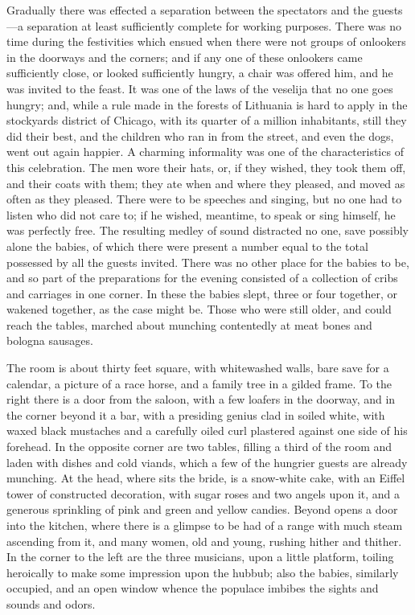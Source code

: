 \documentclass[
]{book}
\theoremstyle{definition}
\theoremstyle{definition}
\theoremstyle{definition}
\theoremstyle{definition}
\theoremstyle{remark}
\begin{document}
Gradually there was effected a separation between the spectators and the guests---a separation at least sufficiently complete for working purposes. There was no time during the festivities which ensued when there were not groups of onlookers in the doorways and the corners; and if any one of these onlookers came sufficiently close, or looked sufficiently hungry, a chair was offered him, and he was invited to the feast. It was one of the laws of the veselija that no one goes hungry; and, while a rule made in the forests of Lithuania is hard to apply in the stockyards district of Chicago, with its quarter of a million inhabitants, still they did their best, and the children who ran in from the street, and even the dogs, went out again happier. A charming informality was one of the characteristics of this celebration. The men wore their hats, or, if they wished, they took them off, and their coats with them; they ate when and where they pleased, and moved as often as they pleased. There were to be speeches and singing, but no one had to listen who did not care to; if he wished, meantime, to speak or sing himself, he was perfectly free. The resulting medley of sound distracted no one, save possibly alone the babies, of which there were present a number equal to the total possessed by all the guests invited. There was no other place for the babies to be, and so part of the preparations for the evening consisted of a collection of cribs and carriages in one corner. In these the babies slept, three or four together, or wakened together, as the case might be. Those who were still older, and could reach the tables, marched about munching contentedly at meat bones and bologna sausages.

The room is about thirty feet square, with whitewashed walls, bare save for a calendar, a picture of a race horse, and a family tree in a gilded frame. To the right there is a door from the saloon, with a few loafers in the doorway, and in the corner beyond it a bar, with a presiding genius clad in soiled white, with waxed black mustaches and a carefully oiled curl plastered against one side of his forehead. In the opposite corner are two tables, filling a third of the room and laden with dishes and cold viands, which a few of the hungrier guests are already munching. At the head, where sits the bride, is a snow-white cake, with an Eiffel tower of constructed decoration, with sugar roses and two angels upon it, and a generous sprinkling of pink and green and yellow candies. Beyond opens a door into the kitchen, where there is a glimpse to be had of a range with much steam ascending from it, and many women, old and young, rushing hither and thither. In the corner to the left are the three musicians, upon a little platform, toiling heroically to make some impression upon the hubbub; also the babies, similarly occupied, and an open window whence the populace imbibes the sights and sounds and odors.
\end{document}

